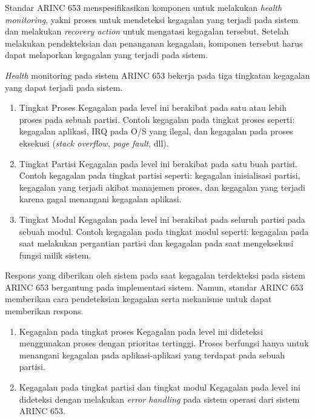 Standar ARINC 653 menspesifikasikan komponen untuk melakukan \textit{health monitoring}, yakni
proses untuk mendeteksi kegagalan yang terjadi pada sistem dan melakukan \textit{recovery
action} untuk mengatasi kegagalan tersebut. Setelah melakukan pendekteksian dan penanganan
kegagalan, komponen tersebut harus dapat melaporkan kegagalan yang terjadi pada sistem.

\textit{Health} monitoring pada sistem ARINC 653 bekerja pada tiga tingkatan kegagalan yang
dapat terjadi pada sistem.
\begin{enumerate}
	\item Tingkat Proses
		Kegagalan pada level ini berakibat pada satu atau lebih proses pada sebuah
		partisi. Contoh kegagalan pada tingkat proses seperti: kegagalan aplikasi, IRQ
		pada O/S yang ilegal, dan kegagalan pada proses eksekusi (\textit{stack
		overflow}, \textit{page fault}, dll).

	\item Tingkat Partisi
		Kegagalan pada level ini berakibat pada satu buah partisi. Contoh kegagalan pada
		tingkat partisi seperti: kegagalan inisialisasi partisi, kegagalan yang terjadi
		akibat manajemen proses, dan kegagalan yang terjadi karena gagal menangani
		kegagalan aplikasi.

	\item Tingkat Modul
		Kegagalan pada level ini berakibat pada seluruh partisi pada sebuah modul.
		Contoh kegagalan pada tingkat modul seperti: kegagalan pada saat melakukan
		pergantian partisi dan kegagalan pada saat mengeksekusi fungsi milik sistem.
\end{enumerate}

Respons yang diberikan oleh sistem pada saat kegagalan terdekteksi pada sistem ARINC 653
bergantung pada implementasi sistem. Namun, standar ARINC 653 memberikan cara pendeteksian
kegagalan serta mekanisme untuk dapat memberikan respons.
\begin{enumerate}
	\item Kegagalan pada tingkat proses
		Kegagalan pada level ini dideteksi menggunakan proses dengan prioritas
		tertinggi. Proses berfungsi hanya untuk menangani kegagalan pada
		aplikasi-aplikasi yang terdapat pada sebuah partisi.

	\item Kegagalan pada tingkat partisi dan tingkat modul
		Kegagalan pada level ini dideteksi dengan melakukan \textit{error handling} pada
		sistem operasi dari sistem ARINC 653.
\end{enumerate}


